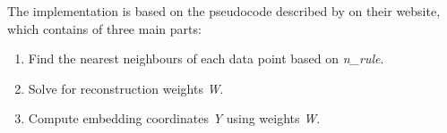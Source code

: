 The implementation is based on the pseudocode described by  on their website, which contains of three main parts:
\begin{enumerate}
	\item Find the nearest neighbours of each data point based on \textit{n\_rule}.
	\item Solve for reconstruction weights \textit{W}.
	\item Compute embedding coordinates \textit{Y} using weights \textit{W}.
\end{enumerate}
